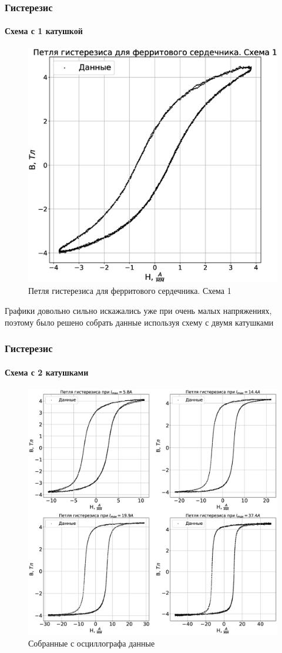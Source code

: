 \documentclass[8pt,pdf,hyperref={unicode}]{beamer}
\begin{document}
	\begin{frame}
		\frametitle{Гистерезис}
		 \framesubtitle{Схема с 1 катушкой}
		\begin{center}
			\begin{figure}[h!]
				\centering
				\includegraphics[width=.45\linewidth]{Lab2_2.eps}
				\caption{Петля гистерезиса для ферритового сердечника. Схема 1}
				\label{fig:3}
			\end{figure}
		Графики довольно сильно искажались уже при очень малых напряжениях, поэтому было решено собрать данные используя схему с двумя катушками
		\end{center}
	\end{frame}

	\begin{frame}
		\frametitle{Гистерезис}
		\framesubtitle{Схема с 2 катушками}
		\begin{center}
			\begin{figure}[h!]
				\centering
				\includegraphics[width=.65\linewidth]{Lab2_3.eps}
				\caption{Собранные с осциллографа данные}
				\label{fig:3}
			\end{figure}
		\end{center}
	\end{frame}
	
\end{document}
